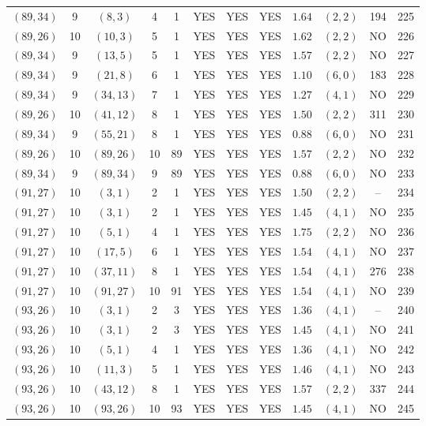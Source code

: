 \begin{longtable}{|c|c|c|c|c|c|c|c|c|c|c|c|}
$(89,34)$ & 9 & $(8,3)$ & 4 & 1 & YES & YES & YES & $1.64$ & $(2,2)$ & 194 & 225\\
$(89,26)$ & 10 & $(10,3)$ & 5 & 1 & YES & YES & YES & $1.62$ & $(2,2)$ & NO & 226\\
$(89,34)$ & 9 & $(13,5)$ & 5 & 1 & YES & YES & YES & $1.57$ & $(2,2)$ & NO & 227\\
$(89,34)$ & 9 & $(21,8)$ & 6 & 1 & YES & YES & YES & $1.10$ & $(6,0)$ & 183 & 228\\
$(89,34)$ & 9 & $(34,13)$ & 7 & 1 & YES & YES & YES & $1.27$ & $(4,1)$ & NO & 229\\
$(89,26)$ & 10 & $(41,12)$ & 8 & 1 & YES & YES & YES & $1.50$ & $(2,2)$ & 311 & 230\\
$(89,34)$ & 9 & $(55,21)$ & 8 & 1 & YES & YES & YES & $0.88$ & $(6,0)$ & NO & 231\\
$(89,26)$ & 10 & $(89,26)$ & 10 & 89 & YES & YES & YES & $1.57$ & $(2,2)$ & NO & 232\\
$(89,34)$ & 9 & $(89,34)$ & 9 & 89 & YES & YES & YES & $0.88$ & $(6,0)$ & NO & 233\\
$(91,27)$ & 10 & $(3,1)$ & 2 & 1 & YES & YES & YES & $1.50$ & $(2,2)$ & -- & 234\\
$(91,27)$ & 10 & $(3,1)$ & 2 & 1 & YES & YES & YES & $1.45$ & $(4,1)$ & NO & 235\\
$(91,27)$ & 10 & $(5,1)$ & 4 & 1 & YES & YES & YES & $1.75$ & $(2,2)$ & NO & 236\\
$(91,27)$ & 10 & $(17,5)$ & 6 & 1 & YES & YES & YES & $1.54$ & $(4,1)$ & NO & 237\\
$(91,27)$ & 10 & $(37,11)$ & 8 & 1 & YES & YES & YES & $1.54$ & $(4,1)$ & 276 & 238\\
$(91,27)$ & 10 & $(91,27)$ & 10 & 91 & YES & YES & YES & $1.54$ & $(4,1)$ & NO & 239\\
$(93,26)$ & 10 & $(3,1)$ & 2 & 3 & YES & YES & YES & $1.36$ & $(4,1)$ & -- & 240\\
$(93,26)$ & 10 & $(3,1)$ & 2 & 3 & YES & YES & YES & $1.45$ & $(4,1)$ & NO & 241\\
$(93,26)$ & 10 & $(5,1)$ & 4 & 1 & YES & YES & YES & $1.36$ & $(4,1)$ & NO & 242\\
$(93,26)$ & 10 & $(11,3)$ & 5 & 1 & YES & YES & YES & $1.46$ & $(4,1)$ & NO & 243\\
$(93,26)$ & 10 & $(43,12)$ & 8 & 1 & YES & YES & YES & $1.57$ & $(2,2)$ & 337 & 244\\
$(93,26)$ & 10 & $(93,26)$ & 10 & 93 & YES & YES & YES & $1.45$ & $(4,1)$ & NO & 245\\

\end{longtable}
